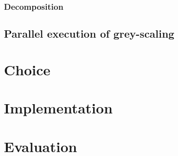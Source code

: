 \documentclass[a4paper]{article}
\begin{document}
\subsubsection{Decomposition}

\subsection{Parallel execution of grey-scaling}

\section{Choice}

\section{Implementation}

\section{Evaluation}
\end{document}
